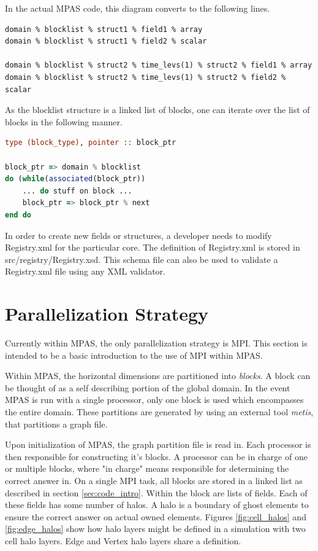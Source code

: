 \documentclass[11pt]{report}
\begin{document}
In the actual MPAS code, this diagram converts to the following lines.
{\tiny
\begin{lstlisting}
domain % blocklist % struct1 % field1 % array
domain % blocklist % struct1 % field2 % scalar

domain % blocklist % struct2 % time_levs(1) % struct2 % field1 % array
domain % blocklist % struct2 % time_levs(1) % struct2 % field2 % scalar
\end{lstlisting}
}

As the blocklist structure is a linked list of blocks, one can iterate over the
list of blocks in the following manner.

\begin{lstlisting}[language=fortran,escapechar=@,frame=single]
type (block_type), pointer :: block_ptr

block_ptr => domain % blocklist
do (while(associated(block_ptr))
	... do stuff on block ...
	block_ptr => block_ptr % next
end do
\end{lstlisting}

In order to create new fields or structures, a developer needs to modify
Registry.xml for the particular core. The definition of Registry.xml is stored
in src/registry/Registry.xsd. This schema file can also be used to validate a
Registry.xml file using any XML validator.


\section{Parallelization Strategy}
Currently within MPAS, the only parallelization strategy is MPI. This section
is intended to be a basic introduction to the use of MPI within MPAS.

Within MPAS, the horizontal dimensions are partitioned into {\it blocks}. A
block can be thought of as a self describing portion of the global domain. In
the event MPAS is run with a single processor, only one block is used which
encompasses the entire domain. These partitions are generated by using an
external tool {\it metis}, that partitions a graph file.

Upon initialization of MPAS, the graph partition file is read in. Each
processor is then responsible for constructing it's blocks. A processor can be
in charge of one or multiple blocks, where "in charge" means responsible for
determining the correct answer in. On a single MPI task, all blocks are stored
in a linked list as described in section \ref{sec:code_intro}. Within the block
are lists of fields. Each of these fields has some number of halos. A halo is a
boundary of ghost elements to ensure the correct answer on actual owned
elements. Figures \ref{fig:cell_halos} and \ref{fig:edge_halos} show how halo
layers might be defined in a simulation with two cell halo layers. Edge and
Vertex halo layers share a definition.
\end{document}
